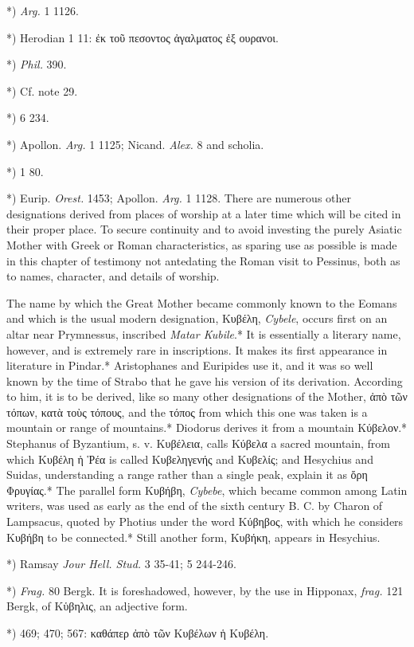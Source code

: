 \documentclass[a4paper, 11pt, oneside, polutonikogreek, english]{article}
\begin{document}
*) \emph{Arg.} 1 1126.

*) Herodian 1 11: ἐκ τοῦ πεσοντος ἀγαλματος ἐξ ουρανοι.

*) \emph{Phil.} 390.

*) Cf. note 29.

*) 6 234.

*) Apollon. \emph{Arg.} 1 1125; Nicand. \emph{Alex.} 8 and scholia.

*) 1 80.

*) Eurip. \emph{Orest.} 1453; Apollon. \emph{Arg.} 1 1128. There are numerous other designations derived from places of worship at a later time which will be cited in their proper place. To secure continuity and to avoid investing the purely Asiatic Mother with Greek or Roman characteristics, as sparing use as possible is made in this chapter of testimony not antedating the Roman visit to Pessinus, both as to names, character, and details of worship.

The name by which the Great Mother became commonly known to the Eomans and which is the usual modern designation, Κυβέλη, \emph{Cybele}, occurs first on an altar near Prymnessus, inscribed \emph{Matar Kubile}.* It is essentially a literary name, however, and is extremely rare in inscriptions. It makes its first appearance in literature in Pindar.* Aristophanes and Euripides use it, and it was so well known by the time of Strabo that he gave his version of its derivation. According to him, it is to be derived, like so many other designations of the Mother, ἀπὸ τῶν τόπων, κατὰ τοὺς τόπους, and the τόπος from which this one was taken is a mountain or range of mountains.* Diodorus derives it from a mountain Κύβελον.* Stephanus of Byzantium, s. v. Κυβέλεια, calls Κύβελα a sacred mountain, from which Κυβέλη ἡ Ῥέα is called Κυβεληγενής and Κυβελίς; and Hesychius and Suidas, understanding a range rather than a single peak, explain it as ὄρη Φρυγίας.* The parallel form Κυβήβη, \emph{Cybebe}, which became common among Latin writers, was used as early as the end of the sixth century B. C. by Charon of Lampsacus, quoted by Photius under the word Κύβηβος, with which he considers Κυβήβη to be connected.* Still another form, Κυβήκη, appears in Hesychius.

*) Ramsay \emph{Jour Hell. Stud.} 3 35-41; 5 244-246.

*) \emph{Frag.} 80 Bergk. It is foreshadowed, however, by the use in Hipponax, \emph{frag.} 121 Bergk, of Κὑβηλις, an adjective form.

*) 469; 470; 567: καθάπερ ἀπὸ τῶν Κυβέλων ἡ Κυβέλη.
\end{document}
